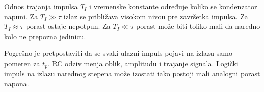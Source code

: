 Odnos trajanja impulsa $T_I$ i vremenske konstante određuje koliko se kondenzator napuni. Za $T_I\gg\tau$ izlaz se približava visokom nivou pre završetka impulsa. Za $T_I\approx\tau$ porast ostaje nepotpun. Za $T_I\ll\tau$ porast može biti toliko mali da naredno kolo ne prepozna jedinicu.

Pogrešno je pretpostaviti da se svaki ulazni impuls pojavi na izlazu samo pomeren za $t_p$. RC odziv menja oblik, amplitudu i trajanje signala. Logički impuls na izlazu narednog stepena može izostati iako postoji mali analogni porast napona.

